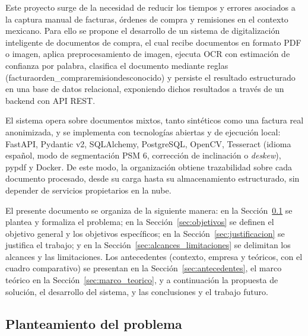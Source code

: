 Este proyecto surge de la necesidad de reducir los tiempos y errores asociados a la captura manual de facturas, órdenes de compra y remisiones en el contexto mexicano. Para ello se propone el desarrollo de un sistema de digitalización inteligente de documentos de compra, el cual recibe documentos en formato PDF o imagen, aplica preprocesamiento de imagen, ejecuta OCR con estimación de confianza por palabra, clasifica el documento mediante reglas (factura\textbar orden\_compra\textbar remision\textbar desconocido) y persiste el resultado estructurado en una base de datos relacional, exponiendo dichos resultados a través de un backend con API REST.

El sistema opera sobre documentos mixtos, tanto sintéticos como una factura real anonimizada, y se implementa con tecnologías abiertas y de ejecución local: FastAPI, Pydantic v2, SQLAlchemy, PostgreSQL, OpenCV, Tesseract (idioma español, modo de segmentación PSM 6, corrección de inclinación o \textit{deskew}), pypdf y Docker\cite{fastapi_docs, opencv_docs}. De este modo, la organización obtiene trazabilidad sobre cada documento procesado, desde su carga hasta su almacenamiento estructurado, sin depender de servicios propietarios en la nube.

El presente documento se organiza de la siguiente manera: en la Sección~\ref{sec:problema} se plantea y formaliza el problema; en la Sección~\ref{sec:objetivos} se definen el objetivo general y los objetivos específicos; en la Sección~\ref{sec:justificacion} se justifica el trabajo; y en la Sección~\ref{sec:alcances_limitaciones} se delimitan los alcances y las limitaciones. Los antecedentes (contexto, empresa y teóricos, con el cuadro comparativo) se presentan en la Sección~\ref{sec:antecedentes}, el marco teórico en la Sección~\ref{sec:marco_teorico}, y a continuación la propuesta de solución, el desarrollo del sistema, y las conclusiones y el trabajo futuro.


\subsection{Planteamiento del problema} \label{sec:problema} %

